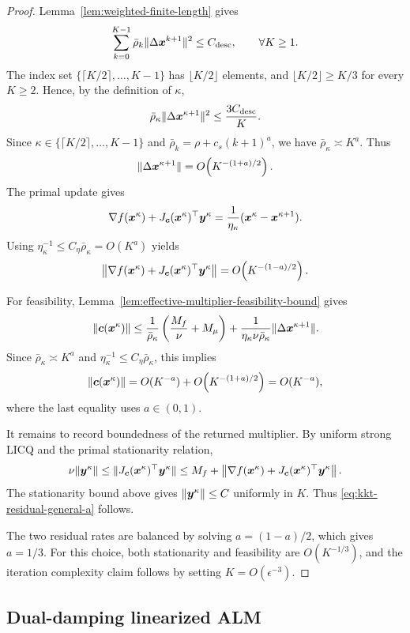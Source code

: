 \documentclass[10pt]{article}
\begin{document}
\begin{proof}
Lemma~\ref{lem:weighted-finite-length} gives
\[
    \sum_{k=0}^{K-1}
    \bar\rho_k\|\Delta\bm{x}^{k+1}\|^2
    \le
    C_{\mathrm{desc}},
    \qquad
    \forall K\ge1.
\]
The index set $\{\lceil K/2\rceil,\ldots,K-1\}$ has
$\lfloor K/2\rfloor$ elements, and $\lfloor K/2\rfloor\ge K/3$ for every
$K\ge2$.  Hence, by the definition of $\kappa$,
\[
    \bar\rho_\kappa\|\Delta\bm{x}^{\kappa+1}\|^2
    \le
    \frac{3C_{\mathrm{desc}}}{K}.
\]
Since $\kappa\in\{\lceil K/2\rceil,\ldots,K-1\}$ and
$\bar\rho_k=\rho+c_s(k+1)^a$, we have $\bar\rho_\kappa\asymp K^a$.  Thus
\[
    \|\Delta\bm{x}^{\kappa+1}\|
    =
    O\!\left(K^{-(1+a)/2}\right).
\]
The primal update gives
\[
    \nabla f(\bm{x}^\kappa)
    +
    J_{\bm{c}}(\bm{x}^\kappa)^\top \bm{y}^\kappa
    =
    \frac{1}{\eta_\kappa}
    (\bm{x}^\kappa-\bm{x}^{\kappa+1}).
\]
Using $\eta_\kappa^{-1}\le C_\eta\bar\rho_\kappa=O(K^a)$ yields
\[
    \left\|
    \nabla f(\bm{x}^\kappa)
    +
    J_{\bm{c}}(\bm{x}^\kappa)^\top \bm{y}^\kappa
    \right\|
    =
    O\!\left(K^{-(1-a)/2}\right).
\]

For feasibility, Lemma~\ref{lem:effective-multiplier-feasibility-bound} gives
\[
    \|\bm{c}(\bm{x}^\kappa)\|
    \le
    \frac{1}{\bar\rho_\kappa}
    \left(
    \frac{M_f}{\nu}+M_\mu
    \right)
    +
    \frac{1}{\eta_\kappa\nu\bar\rho_\kappa}
    \|\Delta\bm{x}^{\kappa+1}\|.
\]
Since $\bar\rho_\kappa\asymp K^a$ and
$\eta_\kappa^{-1}\le C_\eta\bar\rho_\kappa$, this implies
\[
    \|\bm{c}(\bm{x}^\kappa)\|
    =
    O(K^{-a})
    +
    O\!\left(K^{-(1+a)/2}\right)
    =
    O(K^{-a}),
\]
where the last equality uses $a\in(0,1)$.

It remains to record boundedness of the returned multiplier.  By uniform
strong LICQ and the primal stationarity relation,
\[
    \nu\|\bm{y}^\kappa\|
    \le
    \|J_{\bm{c}}(\bm{x}^\kappa)^\top\bm{y}^\kappa\|
    \le
    M_f
    +
    \left\|
    \nabla f(\bm{x}^\kappa)
    +
    J_{\bm{c}}(\bm{x}^\kappa)^\top\bm{y}^\kappa
    \right\|.
\]
The stationarity bound above gives $\|\bm{y}^\kappa\|\le C$ uniformly in $K$.
Thus \eqref{eq:kkt-residual-general-a} follows.

The two residual rates are balanced by solving
$a=(1-a)/2$, which gives $a=1/3$. For this choice, both stationarity and
feasibility are $O(K^{-1/3})$, and the iteration complexity claim follows by
setting $K=O(\epsilon^{-3})$.
\end{proof}

\subsection{Dual-damping linearized ALM}
\end{document}
